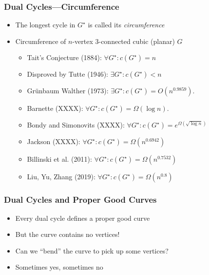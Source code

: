 \documentclass[xcolor=dvipsnames]{beamer}
\newcommand{\dual}[1]{#1^\star}
\begin{document}
\begin{frame}
   \frametitle{Dual Cycles---Circumference}

   \begin{itemize}[<+->]
      \item The longest cycle in $\dual{G}$ is called its \emph{circumference} 
      \item Circumference of $n$-vertex 3-connected cubic (planar) $G$
      \begin{itemize}
        \item Tait's Conjecture (1884): $\forall \dual{G}: c(\dual{G}) = n$
        \item Disproved by Tutte (1946): $\exists \dual{G}: c(\dual{G})< n$
        \item Gr\"unbaum Walther (1973): $\exists \dual{G}: c(\dual{G}) = O(n^{0.9859})$.
        \item Barnette (XXXX): $\forall \dual{G}: c(\dual{G})=\Omega(\log n)$.
        \item Bondy and Simonovits (XXXX): $\forall \dual{G}: c(\dual{G})=e^{\Omega(\sqrt{\log n})}$
        \item Jackson (XXXX): $\forall \dual{G}: c(\dual{G}) = \Omega(n^{0.6942})$
        \item Billinski et al. (2011): $\forall \dual{G}: c(\dual{G}) = \Omega(n^{0.7532})$
        \item Liu, Yu, Zhang (2019): $\forall \dual{G}: c(\dual{G}) = \Omega(n^{0.8})$
      \end{itemize}
   \end{itemize}
\end{frame}

\begin{frame}
   \frametitle{Dual Cycles and Proper Good Curves}

   \begin{itemize}[<+->]
      \item Every dual cycle defines a proper good curve
      \item But the curve contains no vertices!
      \item Can we ``bend'' the curve to pick up some vertices?
      \item Sometimes yes, sometimes no
   \end{itemize}

\end{frame}
\end{document}
